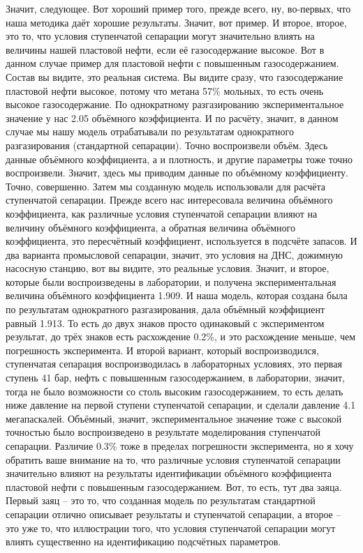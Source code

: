 \documentclass[main.tex]{subfiles}
\begin{document}
Значит, следующее.
Вот хороший пример того, прежде всего, ну, во-первых, что наша методика даёт хорошие результаты.
Значит, вот пример.
И второе, второе, это то, что условия ступенчатой сепарации могут значительно влиять на величины нашей пластовой нефти, если её газосодержание высокое.
Вот в данном случае пример для пластовой нефти с повышенным газосодержанием.
Состав вы видите, это реальная система.
Вы видите сразу, что газосодержание пластовой нефти высокое, потому что метана 57\% мольных, то есть очень высокое газосодержание.
По однократному разгазированию экспериментальное значение у нас 2.05 объёмного коэффициента.
И по расчёту, значит, в данном случае мы нашу модель отрабатывали по результатам однократного разгазирования (стандартной сепарации).
Точно воспроизвели объём.
Здесь данные объёмного коэффициента, а и плотность, и другие параметры тоже точно воспроизвели.
Значит, здесь мы приводим данные по объёмному коэффициенту.
Точно, совершенно.
Затем мы созданную модель использовали для расчёта ступенчатой сепарации.
Прежде всего нас интересовала величина объёмного коэффициента, как различные условия ступенчатой сепарации влияют на величину объёмного коэффициента, а обратная величина объёмного коэффициента, это пересчётный коэффициент, используется в подсчёте запасов.
И два варианта промысловой сепарации, значит, это условия на ДНС, дожимную насосную станцию, вот вы видите, это реальные условия.
Значит, и второе, которые были воспроизведены в лаборатории, и получена экспериментальная величина объёмного коэффициента 1.909.
И наша модель, которая создана была по результатам однократного разгазирования, дала объёмный коэффициент равный 1.913.
То есть до двух знаков просто одинаковый с экспериментом результат, до трёх знаков есть расхождение 0.2\%, и это расхождение меньше, чем погрешность эксперимента.
И второй вариант, который воспроизводился, ступенчатая сепарация воспроизводилась в лабораторных условиях, это первая ступень 41 бар, нефть с повышенным газосодержанием, в лаборатории, значит, тогда не было возможности со столь высоким газосодержанием, то есть делать ниже давление на первой ступени ступенчатой сепарации, и сделали давление 4.1 мегапаскалей.
Объёмный, значит, экспериментальное значение тоже с высокой точностью было воспроизведено в результате моделирования ступенчатой сепарации.
Различие 0.3\% тоже в пределах погрешности эксперимента, но я хочу обратить ваше внимание на то, что различные условия ступенчатой сепарации значительно влияют на результаты идентификации объёмного коэффициента пластовой нефти с повышенным газосодержанием.
Вот, то есть, тут два заяца.
Первый заяц -- это то, что созданная модель по результатам стандартной сепарации отлично описывает результаты и ступенчатой сепарации, а второе -- это уже то, что иллюстрации того, что условия ступенчатой сепарации могут влиять существенно на идентификацию подсчётных параметров.
\end{document}

